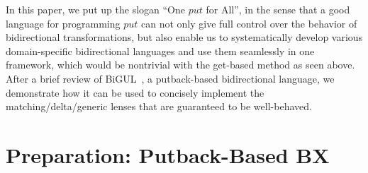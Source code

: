 \documentclass[numbers]{sigplanconf}
\newcommand{\Varid}[1]{\mathit{#1}}
\newcommand{\TODO}[1]{{\color{black!10!blue}TODO #1}}
\begin{document}
In this paper, we put up
the slogan ``One \ensuremath{\Varid{put}} for All'', in the sense that
a good language for programming \ensuremath{\Varid{put}} can not only
give full control over the behavior of bidirectional transformations,
but also enable us to systematically
develop various domain-specific bidirectional languages and use
them seamlessly in one framework, which
would be nontrivial with the get-based method as seen above.
After a brief review of BiGUL~\cite{Ko2016}, a putback-based
bidirectional language, we demonstrate how it can be used to
concisely implement the matching/delta/generic lenses that
are guaranteed to be well-behaved.

\section{Preparation: Putback-Based BX}


\end{document}
